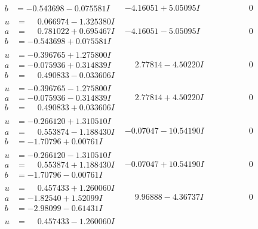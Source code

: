\documentclass[1p]{elsarticle_modified}
\theoremstyle{definition}
\begin{document}
$$\begin{array}{c|c|c}
\begin{aligned}
b &= -0.543698 - 0.075581 I\end{aligned}
 & -4.16051 + 5.05095 I & \phantom{-0.000000 } 0 \\ \hline\begin{aligned}
u &= \phantom{-}0.066974 - 1.325380 I \\
a &= \phantom{-}0.781022 + 0.695467 I \\
b &= -0.543698 + 0.075581 I\end{aligned}
 & -4.16051 - 5.05095 I & \phantom{-0.000000 } 0 \\ \hline\begin{aligned}
u &= -0.396765 + 1.275800 I \\
a &= -0.075936 + 0.314839 I \\
b &= \phantom{-}0.490833 - 0.033606 I\end{aligned}
 & \phantom{-}2.77814 - 4.50220 I & \phantom{-0.000000 } 0 \\ \hline\begin{aligned}
u &= -0.396765 - 1.275800 I \\
a &= -0.075936 - 0.314839 I \\
b &= \phantom{-}0.490833 + 0.033606 I\end{aligned}
 & \phantom{-}2.77814 + 4.50220 I & \phantom{-0.000000 } 0 \\ \hline\begin{aligned}
u &= -0.266120 + 1.310510 I \\
a &= \phantom{-}0.553874 - 1.188430 I \\
b &= -1.70796 + 0.00761 I\end{aligned}
 & -0.07047 - 10.54190 I & \phantom{-0.000000 } 0 \\ \hline\begin{aligned}
u &= -0.266120 - 1.310510 I \\
a &= \phantom{-}0.553874 + 1.188430 I \\
b &= -1.70796 - 0.00761 I\end{aligned}
 & -0.07047 + 10.54190 I & \phantom{-0.000000 } 0 \\ \hline\begin{aligned}
u &= \phantom{-}0.457433 + 1.260060 I \\
a &= -1.82540 + 1.52099 I \\
b &= -2.98099 - 0.61431 I\end{aligned}
 & \phantom{-}9.96888 - 4.36737 I & \phantom{-0.000000 } 0 \\ \hline\begin{aligned}
u &= \phantom{-}0.457433 - 1.260060 I \\

\end{aligned}
\end{array}$$
\end{document}
